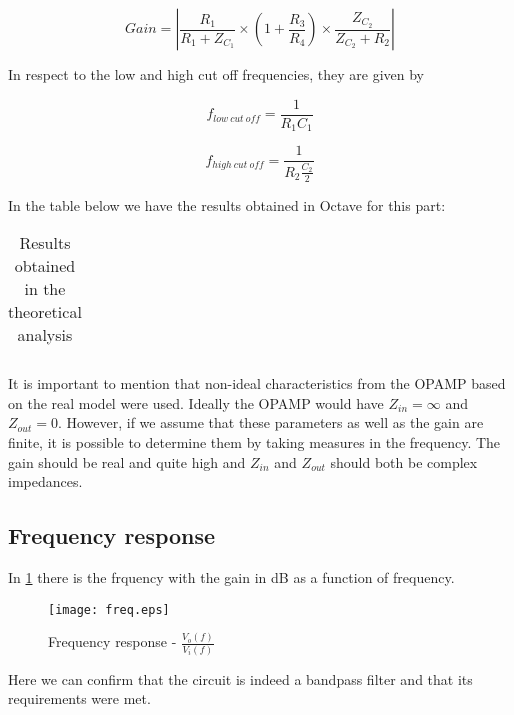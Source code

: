 \begin{equation}
Gain = \left| \frac{R_1}{R_1 + Z_{C_1}} \times  \left(1+\frac{R_3}{R_4}\right) \times \frac{Z_{C_2}}{Z_{C_2}+R_2} \right|
\end{equation}



In respect to the low and high cut off frequencies, they are given by 

\begin{equation}
f_{low \ cut \ off} = \frac{1}{R_1 C_1}
\end{equation}

\begin{equation}
f_{high \ cut \ off} = \frac{1}{R_2 \frac {C_2}{2}}
\end{equation}

In the table below we have the results obtained in Octave for this part:

\begin{table}[H]
  \centering
  \begin{tabular}{|c|c|}
    \hline
      
  \end{tabular}
  \caption{Results obtained in the theoretical analysis}
  \label{tab:results}
\end{table}

It is important to mention that non-ideal characteristics from the OPAMP based on the real model were used. Ideally the OPAMP would have $Z_{in} = \infty$ and $Z_{out} = 0$. However, if we assume that these parameters as well as the gain are finite, it is possible to determine them by taking measures in the frequency. The gain should be real and quite high and $Z_{in}$ and $Z_{out}$ should both be complex impedances.




\subsection{Frequency response}

In \ref{fig:freq_response} there is the frquency with the gain in dB as a function of frequency.


\begin{figure}[H] \centering
\texttt{[image: freq.eps]}
\caption{Frequency response - $\frac{V_o(f)}{V_i(f)}$}
\label{fig:freq_response}
\end{figure}

Here we can confirm that the circuit is indeed a bandpass filter and that its requirements were met. 





